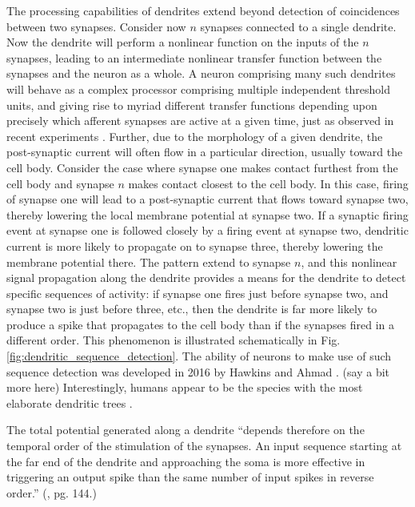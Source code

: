 \documentclass[twocolumn]{article}
\begin{document}
The processing capabilities of dendrites extend beyond detection of coincidences between two synapses. Consider now $n$ synapses connected to a single dendrite. Now the dendrite will perform a nonlinear function on the inputs of the $n$ synapses, leading to an intermediate nonlinear transfer function between the synapses and the neuron as a whole. A neuron comprising many such dendrites will behave as a complex processor comprising multiple independent threshold units, and giving rise to myriad different transfer functions depending upon precisely which afferent synapses are active at a given time, just as observed in recent experiments \cite{sava2017}. Further, due to the morphology of a given dendrite, the post-synaptic current will often flow in a particular direction, usually toward the cell body. Consider the case where synapse one makes contact furthest from the cell body and synapse $n$ makes contact closest to the cell body. In this case, firing of synapse one will lead to a post-synaptic current that flows toward synapse two, thereby lowering the local membrane potential at synapse two. If a synaptic firing event at synapse one is followed closely by a firing event at synapse two, dendritic current is more likely to propagate on to synapse three, thereby lowering the membrane potential there. The pattern extend to synapse $n$, and this nonlinear signal propagation along the dendrite provides a means for the dendrite to detect specific sequences of activity: if synapse one fires just before synapse two, and synapse two is just before three, etc., then the dendrite is far more likely to produce a spike that propagates to the cell body than if the synapses fired in a different order. This phenomenon is illustrated schematically in Fig.\,\ref{fig:dendritic_sequence_detection}. The ability of neurons to make use of such sequence detection was developed in 2016 by Hawkins and Ahmad \cite{haah2015}. (say a bit more here) Interestingly, humans appear to be the species with the most elaborate dendritic trees \cite{el2003}.

\vspace{3em}
The total potential generated along a dendrite ``depends therefore on the temporal order of the stimulation of the synapses. An input sequence starting at the far end of the dendrite and approaching the soma is more effective in triggering an output spike than the same number of input spikes in reverse order.'' (\cite{geki2002}, pg. 144.)

\end{document}
